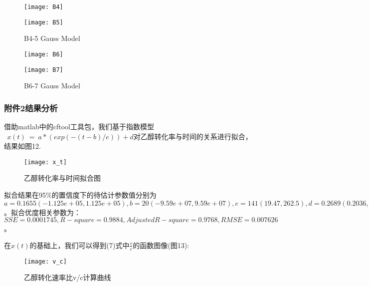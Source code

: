 \documentclass[withoutpreface,bwprint]{cumcmthesis} %
\begin{document}
\newpage

\begin{figure}[!h]
	\centering
	\begin{minipage}[c]{0.45\textwidth}
		\centering
		\texttt{[image: B4]}
		\label{fig:sample-figure-a}
	\end{minipage}
	\begin{minipage}[c]{0.45\textwidth}
		\centering
		\texttt{[image: B5]}
		\label{fig:sample-figure-b}
	\end{minipage}
	\caption{B4-5 Gauss Model}
	\label{fig:sample-figure}
\end{figure}

\begin{figure}[!h]
	\centering
	\begin{minipage}[c]{0.45\textwidth}
		\centering
		\texttt{[image: B6]}
		\label{fig:sample-figure-a}
	\end{minipage}
	\begin{minipage}[c]{0.45\textwidth}
		\centering
		\texttt{[image: B7]}
		\label{fig:sample-figure-b}
	\end{minipage}
	\caption{B6-7 Gauss Model}
	\label{fig:sample-figure}
\end{figure}


\newpage
\subsubsection{附件2结果分析}
借助matlab中的cftool工具包，我们基于指数模型$\ \ x(t)\ =\ a\ast(exp(-(t-b)/e))+d$对乙醇转化率与时间的关系进行拟合，结果如图12.

\begin{figure}[!h]
	\centering
	\texttt{[image: x\_t]}
	\caption{乙醇转化率与时间拟合图}
	\label{fig:circuit-diagram}
\end{figure}
拟合结果在95\%的置信度下的待估计参数值分别为$a = 0.1655  (-1.125e+05, 1.125e+05), b = 20  (-9.59e+07, 9.59e+07), e = 141  (19.47, 262.5),  d = 0.2689  (0.2036, 0.3343)$。拟合优度相关参数为：  $SSE = 0.0001745, R-square = 0.9884 ,Adjusted R-square =  0.9768, RMSE = 0.007626$。

在$x(t)$的基础上，我们可以得到(7)式中$\frac{v}{c}$的函数图像(图13):
\begin{figure}[!h]
	\centering
	\texttt{[image: v\_c]}
	\caption{乙醇转化速率比v/c计算曲线}
	\label{fig:circuit-diagram1}
\end{figure}
\end{document}
